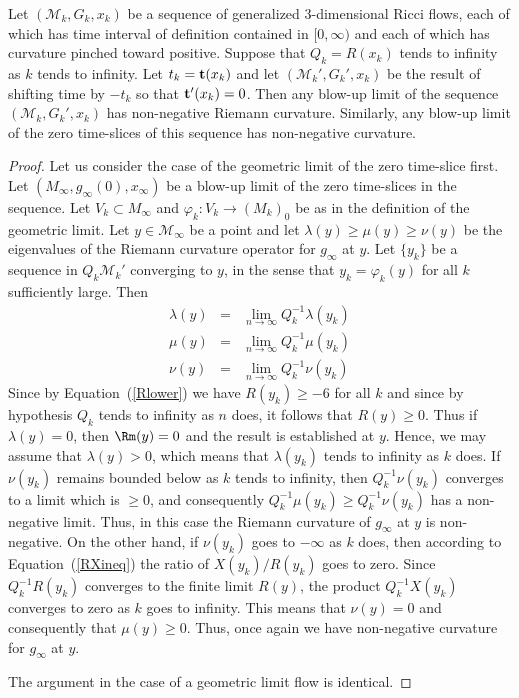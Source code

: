\begin{theorem}\label{thm:blow-up-limit-nonnegative-curvature}
\notready
\label{blowupposcurv}

Let $({\mathcal M}_k,G_k,x_k)$ be a sequence of generalized $3$-dimensional
Ricci flows, each of which has time interval of definition contained in
$[0,\infty)$ and each of which has curvature pinched toward positive. Suppose
that $Q_k=R(x_k)$ tends to infinity as $k$ tends to infinity. Let $t_k={\bf
t}(x_k)$ and let $({\mathcal M}_k',G_k',x_k)$ be the result of shifting time by
$-t_k$ so that ${\bf t}'(x_k)=0$. Then any blow-up limit of the sequence
$({\mathcal M}_k,G_k',x_k)$ has non-negative Riemann curvature. Similarly, any
blow-up limit of the zero time-slices of this sequence has non-negative
curvature.
\end{theorem}

\begin{proof}
\sketch
{}
Let us consider the case of the geometric limit of the zero time-slice first.
Let $( M_\infty,g_\infty(0),x_\infty)$ be a blow-up limit of the zero
time-slices in the sequence. Let $V_k\subset M_\infty$ and $\varphi_k\colon
V_k\to (M_k)_0$ be as in the definition of the geometric limit. Let $y\in
{\mathcal M}_\infty$ be a point and let $\lambda(y)\ge \mu(y)\ge \nu(y)$ be the
eigenvalues of the Riemann curvature operator for $g_\infty$ at $y$. Let
$\{y_k\}$ be a sequence in $Q_k{\mathcal M}_k'$ converging to $y$, in the sense
that $y_k=\varphi_k(y)$ for all $k$ sufficiently large. Then
\begin{eqnarray*}
\lambda(y) & = & \lim_{n\rightarrow\infty}Q_k^{-1}\lambda(y_k) \\
\mu(y) & = & \lim_{n\rightarrow\infty}Q_k^{-1}\mu(y_k) \\
\nu(y) & = & \lim_{n\rightarrow\infty}Q_k^{-1}\nu(y_k)
\end{eqnarray*}
Since by Equation~(\ref{Rlower}) we have $R(y_k)\ge -6$ for all $k$ and since
by hypothesis $Q_k$ tends to infinity as $n$ does, it follows that $R(y)\ge 0$.
Thus if $\lambda(y)=0$, then $\Rm(y)=0$ and the result is established at
$y$. Hence, we may assume that $\lambda(y)>0$, which means that $\lambda(y_k)$
tends to infinity as $k$ does. If $\nu(y_k)$ remains bounded below as $k$ tends
to infinity, then $Q_k^{-1}\nu(y_k)$ converges to a limit which is $\ge 0$, and
consequently $Q_k^{-1}\mu(y_k)\ge Q_k^{-1}\nu(y_k)$ has a non-negative limit.
Thus, in this case the Riemann curvature of $g_\infty$ at $y$ is non-negative.
On the other hand, if $\nu(y_k)$ goes to $-\infty$ as $k$ does, then according
to Equation~(\ref{RXineq}) the ratio of $X(y_k)/R(y_k)$ goes to zero. Since
$Q_k^{-1}R(y_k)$ converges to the finite limit $R(y)$, the product
$Q_k^{-1}X(y_k)$ converges to zero as $k$ goes to infinity. This means that
$\nu(y)=0$ and consequently that $\mu(y)\ge 0$. Thus, once again we have
non-negative curvature for $g_\infty$ at $y$.

The argument in the case of a geometric limit flow is identical.
\end{proof}

